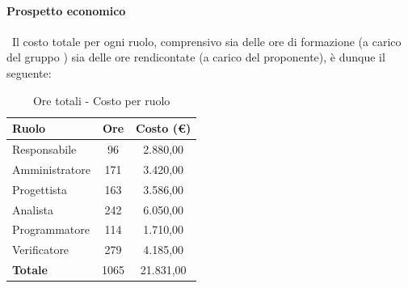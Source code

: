 \documentclass[../PianoProgetto.tex]{subfiles}
\begin{document}
\vfill	
	
	\paragraph{Prospetto economico}\
					Il costo totale per ogni ruolo, comprensivo sia delle ore di formazione (a carico del gruppo \leaf) sia delle ore rendicontate (a carico del proponente), è dunque il seguente:
	\begin{table}[H]
		\centering
		\begin{tabular}{l * {2}{c}}
			\toprule
			\textbf{Ruolo} & \textbf{Ore} & \textbf{Costo (\euro{})} \\
			\midrule
			Responsabile & 96    &  2.880,00 \\
			Amministratore  & 171   &  3.420,00 \\
			Progettista  & 163   &  3.586,00 \\
			Analista & 242   &  6.050,00 \\
			Programmatore  & 114   &  1.710,00 \\
			Verificatore  & 279   &  4.185,00 \\
			\midrule
			\textbf{Totale}  & 1065  &  21.831,00 \\
			\bottomrule
			
		\end{tabular}
		\caption{Ore totali - Costo per ruolo}
		\label{tab:totale_costo}
	\end{table}
\vfill
\newpage	
\vfill
	
\end{document}
